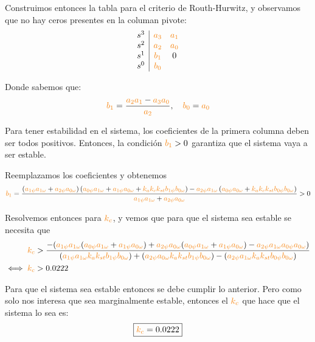 Construimos entonces la tabla para el criterio de Routh-Hurwitz, y observamos
que no hay ceros presentes en la columan pivote:
\begin{equation}
	\begin{array}{c|cc}
		s^3 & \nara{a_3} & \nara{a_1} \\
		s^2 & \nara{a_2} & \nara{a_0} \\
		s^1 & \nara{b_1} & 0 \\
		s^0 & \nara{b_0} & 
	\end{array}
\end{equation}

Donde sabemos que:
\begin{align}
	\nara{b_1} = \frac{\nara{a_2 a_1} - \nara{a_3 a_0}}{\nara{a_2}},\quad
	\nara{b_0} = \nara{a_0}
\end{align}

Para tener estabilidad en el sistema, los coeficientes de la primera columna
deben ser todos positivos. Entonces, la condición $\nara{b_1} > 0$ garantiza
que el sistema vaya a ser estable.

Reemplazamos los coeficientes y obtenemos
\begin{equation}
    \nara{b_1}=\frac{
        \left(\nara{a_{1\psi} a_{1\omega}} + \nara{a_{2\psi} a_{0\omega}}\right)
        \left(\nara{a_{0\psi} a_{1\omega}} + \nara{a_{1\psi} a_{0\omega}} + \nara{k_a k_c k_{st} b_{1\psi} b_{0\omega}}\right) 
        - \nara{a_{2\psi} a_{1\omega}} 
        \left(\nara{a_{0\psi} a_{0\omega}} + \nara{k_a k_c k_{st} b_{0\psi} b_{0\omega}}\right)
    }{
        \nara{a_{1\psi} a_{1\omega}} + \nara{a_{2\psi} a_{0\omega}}
    } > 0
\end{equation}

Resolvemos entonces para $\nara{k_{c}}$, y vemos que para que el sistema sea
estable se necesita que
\begin{align}
	     \nara{k_{c}} &> \dfrac{-(\nara{a_{1\psi} a_{1\omega}}(\nara{a_{0\psi} a_{1\omega}} + \nara{a_{1\psi} a_{0\omega}}) + \nara{ a_{2\psi} a_{0\omega} }(\nara{a_{0\psi} a_{1\omega}} + \nara{a_{1\psi} a_{0\omega}}) - \nara{a_{2\psi} a_{1\omega} a_{0\psi} a_{0\omega}})}  {(\nara{a_{1\psi} a_{1\omega} k_a k_{st} b_{1\psi} b_{0\omega}}) + (\nara{a_{2\psi} a_{0\omega} k_a k_{st} b_{1\psi} b_{0\omega}}) - (\nara{a_{2\psi} a_{1\omega} k_a k_{st} b_{0\psi} b_{0\omega}})} \\
	\iff \nara{k_{c}} &> 0.0222
\end{align}

Para que el sistema sea estable entonces se debe cumplir lo anterior. Pero
como solo nos interesa que sea marginalmente estable, entonces el $\nara{k_{c}}$
que hace que el sistema lo sea es:
\begin{equation}
    \boxed{\nara{k_c} = 0.0222}
\end{equation}

